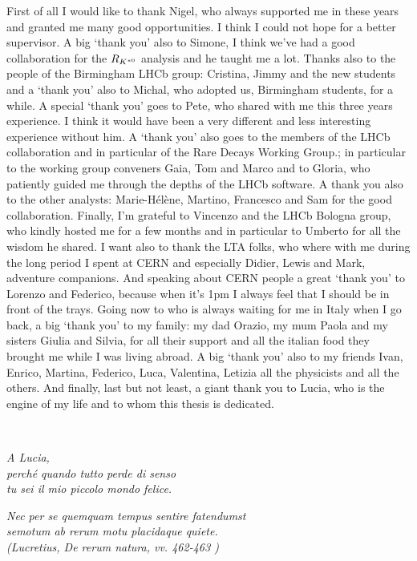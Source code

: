 First of all I would like to thank Nigel, who always supported me in these years and
granted me many good opportunities. I think I could not hope for a better supervisor.
A big `thank you' also to Simone, I think we've had a good collaboration for the $R_{K^{*0}}$ analysis
and he taught me a lot. Thanks also to the people of the Birmingham LHCb group:
Cristina, Jimmy and the new students and a `thank you' also to Michal, who adopted us, Birmingham students, for a while.
A special `thank you' goes to Pete, who shared with me this three years experience.
I think it would have been a very different and less interesting experience without him.
A `thank you' also goes to the members of the LHCb collaboration and in particular of the Rare
Decays Working Group.; in particular to the working group conveners Gaia, Tom and Marco
and to Gloria, who patiently guided me through the depths of the LHCb software.
A thank you also to the other \RKst analysts: Marie-H\'el\`ene, Martino, Francesco and Sam for the good collaboration.
Finally, I'm grateful to Vincenzo and the LHCb Bologna group, who kindly hosted me
for a few months and in particular to Umberto for all the wisdom he shared. 
I want also to thank the LTA folks, who where with me during the long period I spent at CERN
and especially Didier, Lewis and Mark, adventure companions. And speaking about CERN people
a great `thank you' to Lorenzo and Federico, because when it's 1pm I always feel that I should be in front of the trays.
Going now to who is always waiting for me in Italy when I go back, a big `thank you' to my
family: my dad Orazio, my mum Paola and my sisters Giulia and
Silvia, for all their support and all the italian food they brought me while I was living abroad.
A big `thank you' also to my friends Ivan, Enrico, Martina, Federico, Luca, Valentina, Letizia
all the physicists and all the others. And finally, last but not least, a giant thank you to Lucia, 
who is the engine of my life and to whom this thesis is dedicated.

\cleardoublepage
~

\begin{flushright}
  \emph{A Lucia, \\
  perch\'{e} quando tutto perde di senso \\
  tu sei il mio piccolo mondo felice.}
  
  \vspace{10cm}
  
   \emph{
   Nec per se quemquam tempus sentire fatendumst \\
   semotum ab rerum motu placidaque quiete. \\
   (Lucretius, De rerum natura, vv. 462-463 )
   } 
\end{flushright}

\cleardoublepage
